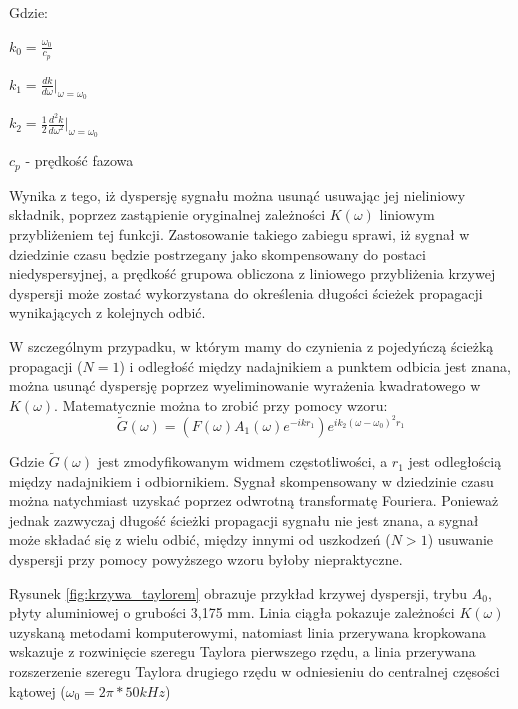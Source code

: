 Gdzie:

$k_0 = \frac{\omega _0}{c_p}$

$k_1 = \frac{dk}{d\omega}|_{\omega = \omega_0}$

$k_2 = \frac{1}{2}\frac{d^2k}{d\omega ^2}|_{\omega = \omega _0}$

$c_p$ - prędkość fazowa

Wynika z tego, iż dyspersję sygnału można usunąć usuwając jej nieliniowy składnik, poprzez zastąpienie oryginalnej zależności $K(\omega)$ liniowym przybliżeniem tej funkcji. Zastosowanie takiego zabiegu sprawi, iż sygnał w dziedzinie czasu będzie postrzegany jako skompensowany do postaci niedyspersyjnej, a prędkość grupowa obliczona z liniowego przybliżenia krzywej dyspersji może zostać wykorzystana do określenia długości ścieżek propagacji wynikających z kolejnych odbić. 

W szczególnym przypadku, w którym mamy do czynienia z pojedyńczą ścieżką propagacji ($N=1$) i odległość między nadajnikiem a punktem odbicia jest znana, można usunąć dyspersję poprzez wyeliminowanie wyrażenia kwadratowego w $K(\omega)$. Matematycznie można to zrobić przy pomocy wzoru:
\begin{equation}
 \widetilde{G}(\omega)=(F(\omega)A_1(\omega)e^{-ikr_1})e^{ik_2(\omega -\omega _0)^2r_1}
\end{equation}

Gdzie $\widetilde{G}(\omega)$ jest zmodyfikowanym widmem częstotliwości, a $r_1$ jest odległością między nadajnikiem i odbiornikiem. Sygnał skompensowany w dziedzinie czasu można natychmiast uzyskać poprzez odwrotną transformatę Fouriera. Ponieważ jednak zazwyczaj długość ścieżki propagacji sygnału nie jest znana, a sygnał może składać się z wielu odbić, między innymi od uszkodzeń ($N>1$) usuwanie dyspersji przy pomocy powyższego wzoru byłoby niepraktyczne. 

Rysunek \ref{fig:krzywa_taylorem} obrazuje przykład krzywej dyspersji, trybu $A_0$, płyty aluminiowej o grubości 3,175 mm. Linia ciągła pokazuje zależności $K(\omega)$ uzyskaną metodami komputerowymi, natomiast linia przerywana kropkowana wskazuje z rozwinięcie szeregu Taylora pierwszego rzędu, a linia przerywana rozszerzenie szeregu Taylora drugiego rzędu w odniesieniu do centralnej częsości kątowej ($\omega _0 = 2\pi *50 kHz$)

